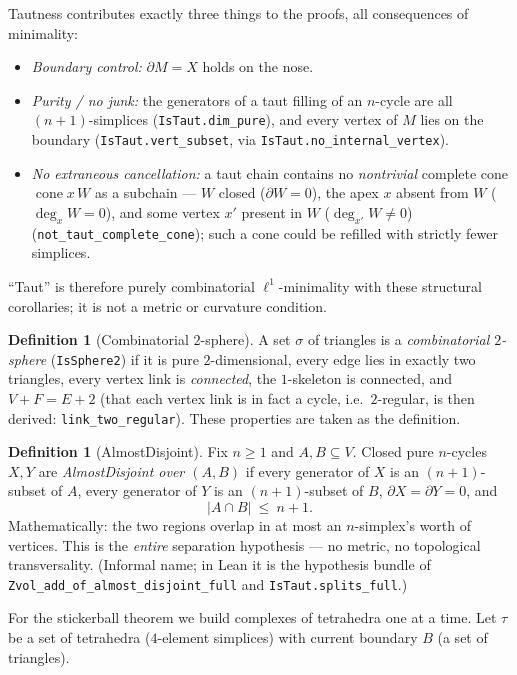 \documentclass[11pt]{article}
\theoremstyle{plain}
\theoremstyle{definition}
\newtheorem{definition}[theorem]{Definition}
\theoremstyle{remark}
\newcommand{\bd}{\partial}
\newcommand{\code}[1]{\texttt{#1}}
\newcommand{\card}[1]{\lvert #1\rvert}
\begin{document}
Tautness contributes exactly three things to the proofs, all consequences of minimality:
\begin{itemize}
\item[(T1)] \emph{Boundary control:} $\bd M=X$ holds on the nose.
\item[(T2)] \emph{Purity / no junk:} the generators of a taut filling of an $n$-cycle are
all $(n{+}1)$-simplices (\code{IsTaut.dim\_pure}), and every vertex of $M$ lies on the
boundary (\code{IsTaut.vert\_subset}, via \code{IsTaut.no\_internal\_vertex}).
\item[(T3)] \emph{No extraneous cancellation:} a taut chain contains no \emph{nontrivial}
complete cone $\operatorname{cone} x\,W$ as a subchain --- $W$ closed ($\bd W=0$), the apex $x$
absent from $W$ ($\deg_x W=0$), and some vertex $x'$ present in $W$ ($\deg_{x'} W\neq 0$)
(\code{not\_taut\_complete\_cone}); such a cone could be
refilled with strictly fewer simplices.
\end{itemize}
``Taut'' is therefore purely combinatorial $\ell^1$-minimality with these structural
corollaries; it is not a metric or curvature condition.

\begin{definition}[Combinatorial $2$-sphere]\label{def:sphere}
A set $\sigma$ of triangles is a \emph{combinatorial $2$-sphere} (\code{IsSphere2}) if it is
pure $2$-dimensional, every edge lies in exactly two triangles, every vertex link is
\emph{connected}, the $1$-skeleton is connected, and $V+F=E+2$ (that each vertex link is in fact a
cycle, i.e.\ $2$-regular, is then derived: \code{link\_two\_regular}). These properties are taken
as the definition.
\end{definition}

\begin{definition}[AlmostDisjoint]\label{def:ad}
Fix $n\ge 1$ and $A,B\subseteq V$. Closed pure $n$-cycles $X,Y$ are
\emph{AlmostDisjoint over $(A,B)$} if every generator of $X$ is an $(n{+}1)$-subset of $A$,
every generator of $Y$ is an $(n{+}1)$-subset of $B$, $\bd X=\bd Y=0$, and
\[
\card{A\cap B}\ \le\ n+1 .
\]
Mathematically: the two regions overlap in at most an $n$-simplex's worth of vertices.
This is the \emph{entire} separation hypothesis --- no metric, no topological transversality.
(Informal name; in Lean it is the hypothesis bundle of
\code{Zvol\_add\_of\_almost\_disjoint\_full} and \code{IsTaut.splits\_full}.)
\end{definition}

For the stickerball theorem we build complexes of tetrahedra one at a time. Let $\tau$ be a
set of tetrahedra ($4$-element simplices) with current boundary $B$ (a set of triangles).
\end{document}
